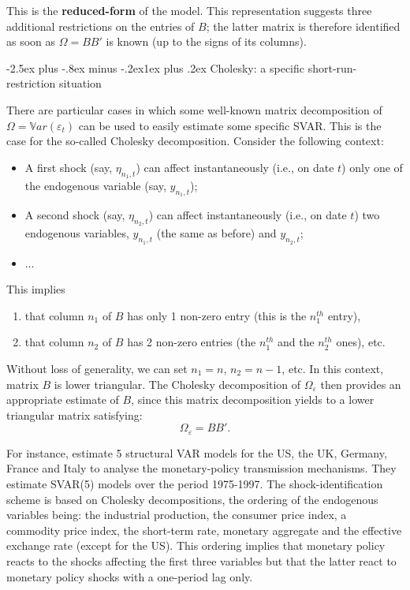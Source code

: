 \documentclass[
  11pt,
]{book}
\makeatletter
\providecommand{\tightlist}{%
  \setlength{\itemsep}{0pt}\setlength{\parskip}{0pt}}
\renewcommand\subsection{\@startsection{subsection}{2}{\z@}
  {-2.5ex plus -.8ex minus -.2ex}{1ex plus .2ex}
  {\normalfont\large\bfseries\color{TextbookInk}}}
\theoremstyle{definition}
\theoremstyle{definition}
\theoremstyle{definition}
\theoremstyle{definition}
\theoremstyle{remark}
\makeatother
\begin{document}
This is the \textbf{reduced-form} of the model. This representation suggests three additional restrictions on the entries of \(B\); the latter matrix is therefore identified as soon as \(\Omega = BB'\) is known (up to the signs of its columns).

\subsection{Cholesky: a specific short-run-restriction situation}\label{cholesky-a-specific-short-run-restriction-situation}

There are particular cases in which some well-known matrix decomposition of \(\Omega=\mathbb{V}ar(\varepsilon_t)\) can be used to easily estimate some specific SVAR. This is the case for the so-called Cholesky decomposition. Consider the following context:

\begin{itemize}
\tightlist
\item
  A first shock (say, \(\eta_{n_1,t}\)) can affect instantaneously
  (i.e., on date \(t\)) only one of the endogenous variable (say, \(y_{n_1,t}\));
\item
  A second shock (say, \(\eta_{n_2,t}\)) can affect instantaneously
  (i.e., on date \(t\)) two endogenous variables, \(y_{n_1,t}\) (the same as before) and \(y_{n_2,t}\);
\item
  \(\dots\)
\end{itemize}

This implies

\begin{enumerate}
\def\labelenumi{\arabic{enumi}.}
\tightlist
\item
  that column \(n_1\) of \(B\) has only 1 non-zero entry (this is the \(n_1^{th}\) entry),
\item
  that column \(n_2\) of \(B\) has 2 non-zero entries (the \(n_1^{th}\) and the \(n_2^{th}\) ones), etc.
\end{enumerate}

Without loss of generality, we can set \(n_1=n\), \(n_2=n-1\), etc. In this context, matrix \(B\) is lower triangular. The Cholesky decomposition of \(\Omega_{\varepsilon}\) then provides an appropriate estimate of \(B\), since this matrix decomposition yields to a lower triangular matrix satisfying:
\[
\Omega_\varepsilon = BB'.
\]

For instance, \citet{DEDOLA20051543} estimate 5 structural VAR models for the US, the UK, Germany, France and Italy to analyse the monetary-policy transmission mechanisms. They estimate SVAR(5) models over the period 1975-1997. The shock-identification scheme is based on Cholesky decompositions, the ordering of the endogenous variables being: the industrial production, the consumer price index, a commodity price index, the short-term rate, monetary aggregate and the effective exchange rate (except for the US). This ordering implies that monetary policy reacts to the shocks affecting the first three variables but that the latter react to monetary policy shocks with a one-period lag only.
\end{document}

